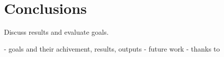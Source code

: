 \chapter{Conclusions}

Discuss results and evaluate goals.

- goals and their achivement, results, outputs
- future work
- thanks to
